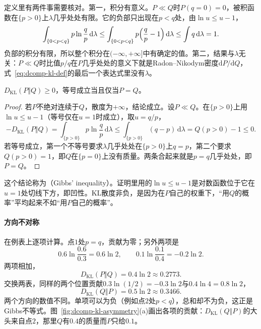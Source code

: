 定义里有两件事需要核对。第一，积分有意义。$P\ll Q$时$P(q=0)=0$，被积函数在$\{p>0\}$上$\lambda$几乎处处有限。它的负部只出现在$p<q$处，由$\ln u\leq u-1$，
\[
 \int_{\{0<p<q\}}p\ln\frac{q}{p}\,\mathrm{d}\lambda\leq\int_{\{0<p<q\}}p\Bigl(\frac{q}{p}-1\Bigr)\,\mathrm{d}\lambda\leq\int q\,\mathrm{d}\lambda=1 .
\]
负部的积分有限，所以整个积分在$(-\infty,+\infty]$中有确定的值。第二，结果与$\lambda$无关：$P\ll Q$时比值$p/q$在$P$几乎处处的意义下就是Radon–Nikodym密度$\mathrm{d}P/\mathrm{d}Q$，式~\eqref{eq:dcomp-kl-def}的最后一个表达式里没有$\lambda$。

\begin{theorem}[Gibbs不等式]
\label{thm:dcomp-gibbs}
$D_{\mathrm{KL}}(P\Vert Q)\geq0$，等号成立当且仅当$P=Q$。
\end{theorem}

\begin{proof}
若$P$不绝对连续于$Q$，散度为$+\infty$，结论成立。设$P\ll Q$。在$\{p>0\}$上用$\ln u\leq u-1$（等号仅在$u=1$时成立），取$u=q/p$，
\[
 -D_{\mathrm{KL}}(P\Vert Q)=\int_{\{p>0\}}p\ln\frac{q}{p}\,\mathrm{d}\lambda\leq\int_{\{p>0\}}(q-p)\,\mathrm{d}\lambda=Q(p>0)-1\leq0 .
\]
若等号成立，第一个不等号要求$\lambda$几乎处处在$\{p>0\}$上$q=p$，第二个要求$Q(p>0)=1$，即$Q$在$\{p=0\}$上没有质量。两条合起来就是$p=q$几乎处处，即$P=Q$。
\end{proof}

这个结论称为（Gibbs' inequality）。证明里用的$\ln u\leq u-1$是对数函数位于它在$u=1$处切线下方，即凹性。KL散度非负，是因为在$P$自己的权重下，“用$Q$的概率”平均起来不如“用$P$自己的概率”。

\paragraph{方向不对称}
在例表上逐项计算。点$1$处$p=q$，贡献为零；另外两项是
\[
 0.6\ln\frac{0.6}{0.3}=0.6\ln2,\qquad 0.1\ln\frac{0.1}{0.4}=-0.2\ln2 .
\]
两项相加，
\[
 D_{\mathrm{KL}}(P\Vert Q)=0.4\ln2\approx0.2773 .
\]
交换两表，同样的两个位置贡献$0.3\ln(1/2)=-0.3\ln2$与$0.4\ln4=0.8\ln2$，
\[
 D_{\mathrm{KL}}(Q\Vert P)=0.5\ln2\approx0.3466 .
\]
两个方向的数值不同。单项可以为负（例如点$2$处$p<q$），总和却不为负，这正是Gibbs不等式。图~\ref{fig:dcomp-kl-asymmetry}(a)画出各项的贡献：$D_{\mathrm{KL}}(Q\Vert P)$的大头来自点$2$，那里$Q$有$0.4$的质量而$P$只给$0.1$。

